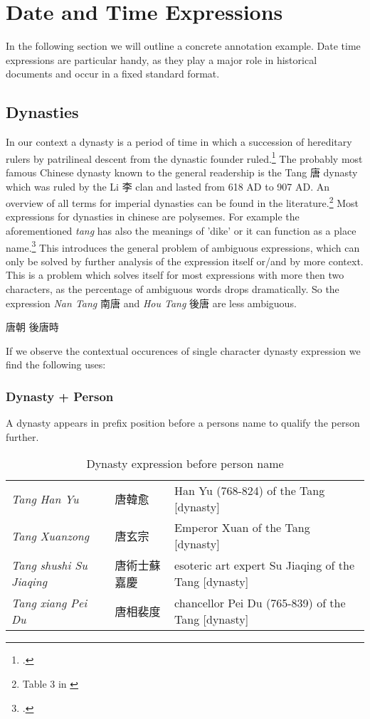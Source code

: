 \documentclass[12pt, draft]{article}
\begin{document}
\section{Date and Time Expressions}

In the following section we will outline a concrete annotation example.
Date time expressions are particular handy, as they play a major role in 
historical documents and occur in a fixed standard format.

\subsection{Dynasties}

In our context a dynasty is a period of time in which a succession of hereditary
rulers by patrilineal descent from the dynastic founder ruled.\footcite[3]{Wilkinson:2012} 
The probably most famous Chinese dynasty known to the general readership
is the Tang 唐 dynasty which was ruled by the Li 李 clan and lasted from 618 AD to 907 AD.
An overview of all terms for imperial dynasties can be found in the literature.\footnote{
Table 3 in \cite[4]{Wilkinson:2012}}
Most expressions for dynasties in chinese are polysemes. For example the aforementioned
\emph{tang} has also the meanings of 'dike' or it can function as a place name.\footcite[117]{Wang:2000}
This introduces the general problem of ambiguous expressions, which can only be solved
by further analysis of the expression itself or/and by more context. This is a problem
which solves itself for most expressions with more then two characters, as the percentage
of ambiguous words drops dramatically. So the expression \emph{Nan Tang} 南唐
and \emph{Hou Tang} 後唐 are less ambiguous.

唐朝
後唐時

If we observe the contextual occurences of single character dynasty expression we find the
following uses:

\subsubsection{Dynasty + Person}
A dynasty appears in prefix position before a persons name to qualify the person further.

{\tiny
\begin{table}[h]
\caption{Dynasty expression before person name}
\begin{tabular}{lll}
\emph{Tang Han Yu} & 唐韓愈 & Han Yu (768-824) of the Tang [dynasty] \\
\emph{Tang Xuanzong} & 唐玄宗 & Emperor Xuan of the Tang [dynasty] \\
\emph{Tang shushi Su Jiaqing} &  唐術士蘇嘉慶 & esoteric art expert Su Jiaqing of the Tang [dynasty] \\
\emph{Tang xiang Pei Du} &  唐相裴度 & chancellor Pei Du (765-839) of the Tang [dynasty] \\
\end{tabular}
\end{table}
}
\end{document}
